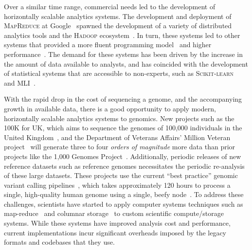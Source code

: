 \documentclass[11pt]{article} %
\begin{document}
Over a similar time range, commercial needs led to the development of horizontally scalable
analytics systems. The development and deployment of \textsc{MapReduce} at
Google~\cite{dean04, dean08} spawned the development of a variety of distributed analytics tools
and the \textsc{Hadoop} ecosystem~\cite{hadoop}. In turn, these systems led to other systems
that provided a more fluent programming model~\cite{yu08} and higher performance~\cite{zaharia10}.
The demand for these systems has been driven by the increase in the amount of data available to
analysts, and has coincided with the development of statistical systems that are accessible to
non-experts, such as \textsc{Scikit-learn}~\cite{pedregosa11} and \textsc{MLI}~\cite{sparks13}.

With the rapid drop in the cost of sequencing a genome, and the accompanying growth in available data,
there is a good opportunity to apply modern, horizontally scalable analytics systems to genomics. New
projects such as the 100K for UK, which aims to sequence the genomes of 100,000 individuals in the
United Kingdom~\cite{uk100k}, and the Department of Veterans Affairs' Million Veteran project~\cite{mvp}
will generate three to four \emph{orders of magnitude} more data than prior projects like the 1,000
Genomes Project~\cite{siva08}. Additionally, periodic releases of new reference datasets such as reference
genomes necessitates the periodic re-analysis of these large datasets. These projects use the current ``best
practice'' genomic variant calling pipelines~\cite{auwera13}, which takes approximately 120 hours to
process a single, high-quality human genome using a single, beefy node~\cite{talwalkar14}. To address
these challenges, scientists have started to apply computer systems techniques such as
map-reduce~\cite{langmead09, mckenna10, schatz09} and columnar storage~\cite{fritz11} to custom
scientific compute/storage systems. While these systems have improved analysis cost and performance,
current implementations incur significant overheads imposed by the legacy formats and codebases that
they use.
\end{document}
